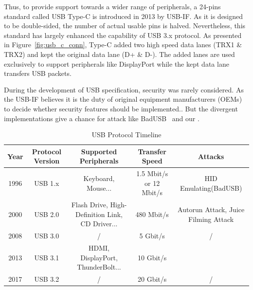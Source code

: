 Thus, to provide support towards a wider range of peripherals, a 24-pins
standard called USB Type-C is introduced in 2013 by USB-IF. As it is designed to be double-sided, the number of actual usable
pins is halved. Nevertheless, this standard has largely enhanced the capability
of USB 3.x protocol. As presented in Figure~\ref{fig:usb_c_conn}, Type-C added
two high speed data lanes (TRX1 \& TRX2) and kept the original data lane (D+ \&
D-). The added lanes are used exclusively to support peripherals like
DisplayPort while the kept data lane transfers USB packets.

During the development of USB specification, security was rarely considered. As
the USB-IF believes it is the duty of original equipment manufacturers (OEMs)
to decide whether security features should be implemented.. But the divergent implementations give a chance for attack like
BadUSB~\cite{rubber} and our \tool.

\begin{table}
\begin{tabular}{|c|c|c|c|c|}
	\hline
	Year & Protocol Version & Supported Peripherals & Transfer Speed & Attacks \\
	\hline
	1996 & USB 1.x & Keyboard, Mouse... & 1.5 Mbit/s or 12 Mbit/s & HID Emulating(BadUSB) \\
	\hline
	2000 & USB 2.0 & Flash Drive, High-Definition Link, CD Driver... & 480 Mbit/s & Autorun Attack, Juice Filming Attack \\
	\hline
	2008 & USB 3.0 & / & 5 Gbit/s & / \\
	\hline
	2013 & USB 3.1 & HDMI, DisplayPort, ThunderBolt... & 10 Gbit/s & \tool \\
	\hline
	2017 & USB 3.2 & / & 20 Gbit/s & / \\
	\hline
\end{tabular}
	\linebreak
\caption{USB Protocol Timeline}
\label{table:usb_timeline}
\end{table}

